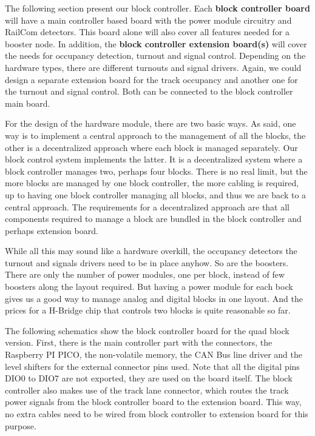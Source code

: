 
The following section present our block controller. Each \textbf{block controller board} will have a main controller based board with the power module circuitry and RailCom detectors. This board alone will also cover all features needed for a booster node. In addition, the\textbf{ block controller extension board(s)} will cover the needs for occupancy detection, turnout and signal control. Depending on the hardware types, there are different turnouts and signal drivers. Again, we could design a separate extension board for the track occupancy and another one for the turnout and signal control. Both can be connected to the block controller main board.

For the design of the hardware module, there are two basic ways. As said, one way is to implement a central approach to the management of all the blocks, the other is a decentralized approach where each block is managed separately. Our block control system implements the latter. It is a decentralized system where a block controller manages two, perhaps four blocks. There is no real limit, but the more blocks are managed by one block controller, the more cabling is required, up to having one block controller managing all blocks, and thus we are back to a central approach. The requirements for a decentralized approach are that all components required to manage a block are bundled in the block controller and perhaps extension board.


While all this may sound like a hardware overkill, the occupancy detectors the turnout and signals drivers need to be in place anyhow. So are the boosters. There are only the number of power modules, one per block, instead of few boosters along the layout required. But having a power module for each bock gives us a good way to manage analog and digital blocks in one layout. And the prices for a H-Bridge chip that controls two blocks is quite reasonable so far.



The following schematics show the block controller board for the quad block version. First, there is the main controller part with the connectors, the Raspberry PI PICO, the non-volatile memory, the CAN Bus line driver and the level shifters for the external connector pins used. Note that all the digital pins DIO0 to DIO7 are not exported, they are used on the board itself. The block controller also makes use of the track lane connector, which routes the track power signals from the block controller board to the extension board. This way, no extra cables need to be wired from block controller to extension board for this purpose. 

